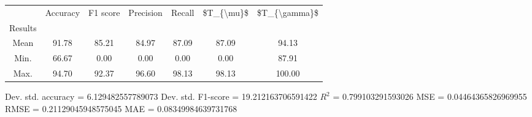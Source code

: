 \begin{tabular}{|c|c|c|c|c|c|c|}
\toprule
{} &  Accuracy &  F1 score &  Precision &  Recall &  \$T\_\{\textbackslash mu\}\$ &  \$T\_\{\textbackslash gamma\}\$ \\
Results &           &           &            &         &            &               \\
\hline
Mean    &     91.78 &     85.21 &      84.97 &   87.09 &      87.09 &         94.13 \\
Min.    &     66.67 &      0.00 &       0.00 &    0.00 &       0.00 &         87.91 \\
Max.    &     94.70 &     92.37 &      96.60 &   98.13 &      98.13 &        100.00 \\
\bottomrule
\end{tabular}

 Dev. std. accuracy = 6.129482557789073
 Dev. std. F1-score = 19.212163706591422
 $R^2$ = 0.799103291593026
 MSE = 0.04464365826969955
 RMSE = 0.21129045948575045
 MAE = 0.08349984639731768